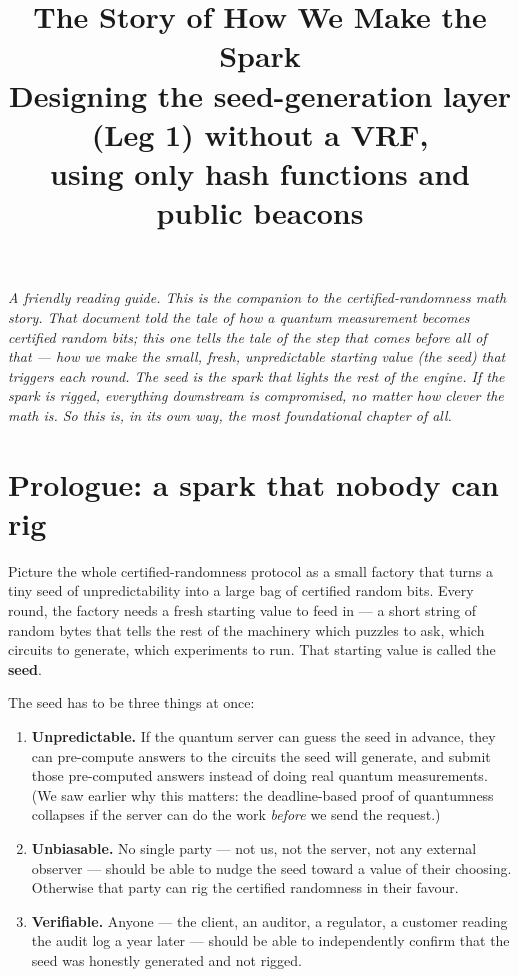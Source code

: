 \documentclass[11pt]{article}
\title{\textbf{The Story of How We Make the Spark} \\
       \large Designing the seed-generation layer (Leg 1) without a VRF, \\ using only hash functions and public beacons}
\author{}
\date{}
\newenvironment{aside}{\par\medskip\noindent\itshape\small\color{black!70}}{\normalfont\par\medskip}
\begin{document}
\maketitle

\begin{aside}
A friendly reading guide. This is the companion to the certified-randomness math story. That document told the tale of \emph{how a quantum measurement becomes certified random bits}; this one tells the tale of the step that comes \emph{before} all of that --- how we make the small, fresh, unpredictable starting value (the \emph{seed}) that triggers each round. The seed is the spark that lights the rest of the engine. If the spark is rigged, everything downstream is compromised, no matter how clever the math is. So this is, in its own way, the most foundational chapter of all.
\end{aside}

\section*{Prologue: a spark that nobody can rig}

Picture the whole certified-randomness protocol as a small factory that turns a tiny seed of unpredictability into a large bag of certified random bits. Every round, the factory needs a fresh starting value to feed in --- a short string of random bytes that tells the rest of the machinery which puzzles to ask, which circuits to generate, which experiments to run. That starting value is called the \textbf{seed}.

The seed has to be three things at once:

\begin{enumerate}[leftmargin=2em, itemsep=2pt]
\item \textbf{Unpredictable.} If the quantum server can guess the seed in advance, they can pre-compute answers to the circuits the seed will generate, and submit those pre-computed answers instead of doing real quantum measurements. (We saw earlier why this matters: the deadline-based proof of quantumness collapses if the server can do the work \emph{before} we send the request.)
\item \textbf{Unbiasable.} No single party --- not us, not the server, not any external observer --- should be able to nudge the seed toward a value of their choosing. Otherwise that party can rig the certified randomness in their favour.
\item \textbf{Verifiable.} Anyone --- the client, an auditor, a regulator, a customer reading the audit log a year later --- should be able to independently confirm that the seed was honestly generated and not rigged.
\end{enumerate}
\end{document}
